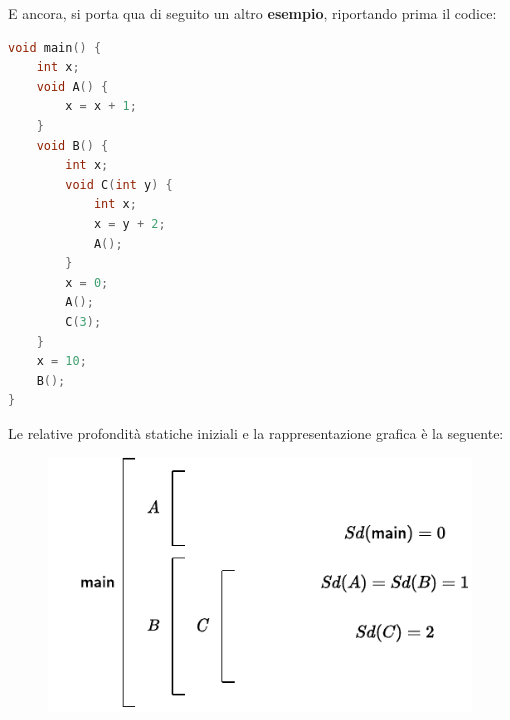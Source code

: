 \documentclass[a4paper]{article}
\begin{document}
	E ancora, si porta qua di seguito un altro \textcolor{Green4}{\textbf{esempio}}, riportando prima il codice:\label{esempio risolvere riferimenti}
	\begin{lstlisting}[language=C]
void main() {
	int x;
	void A() {
		x = x + 1;
	}
	void B() {
		int x;
		void C(int y) {
			int x;
			x = y + 2;
			A();
		}
		x = 0;
		A();
		C(3);
	}
	x = 10;
	B();
}\end{lstlisting}
	Le relative profondità statiche iniziali e la rappresentazione grafica è la seguente:
	\begin{figure}[!htp]
		\centering
		\includegraphics[width=.8\textwidth]{img/link-statici-2.pdf}
	\end{figure}\newpage
	
\end{document}

